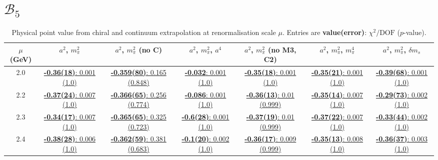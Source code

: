 \documentclass[12pt]{extarticle}
\begin{document}
\section{$\mathcal{B}_5$}
\begin{table}[h!]
\begin{center}
\begin{tabular}{|c|c|c|c|c|c|c|}
\hline
$\mu$ (GeV) & $a^2$, $m_\pi^2$& $a^2$, $m_\pi^2$ (no C)& $a^2$, $m_\pi^2$, $a^4$& $a^2$, $m_\pi^2$ (no M3, C2)& $a^2$, $m_\pi^2$, $m_\pi^4$& $a^2$, $m_\pi^2$, $\delta m_s$\\
\hline
2.0& \hyperlink{TT/NPR/a2m2_20.pdf.1}{\textbf{-0.36(18)}: 0.001 (1.0)} & \hyperlink{TT/NPR/a2m2noC_20.pdf.1}{\textbf{-0.359(80)}: 0.165 (0.848)} & \hyperlink{TT/NPR/a2a4m2_20.pdf.1}{\textbf{-0.032}: 0.001 (1.0)} & \hyperlink{TT/NPR/a2m2mcut_20.pdf.1}{\textbf{-0.35(18)}: 0.001 (1.0)} & \hyperlink{TT/NPR/a2m2m4_20.pdf.1}{\textbf{-0.35(21)}: 0.001 (1.0)} & \hyperlink{TT/NPR/a2m2delm_20.pdf.1}{\textbf{-0.39(68)}: 0.001 (1.0)}\\
2.2& \hyperlink{TT/NPR/a2m2_22.pdf.1}{\textbf{-0.37(24)}: 0.007 (1.0)} & \hyperlink{TT/NPR/a2m2noC_22.pdf.1}{\textbf{-0.366(65)}: 0.256 (0.774)} & \hyperlink{TT/NPR/a2a4m2_22.pdf.1}{\textbf{-0.086}: 0.001 (1.0)} & \hyperlink{TT/NPR/a2m2mcut_22.pdf.1}{\textbf{-0.36(13)}: 0.01 (0.999)} & \hyperlink{TT/NPR/a2m2m4_22.pdf.1}{\textbf{-0.35(14)}: 0.007 (1.0)} & \hyperlink{TT/NPR/a2m2delm_22.pdf.1}{\textbf{-0.29(73)}: 0.002 (1.0)}\\
2.3& \hyperlink{TT/NPR/a2m2_23.pdf.1}{\textbf{-0.34(17)}: 0.007 (1.0)} & \hyperlink{TT/NPR/a2m2noC_23.pdf.1}{\textbf{-0.365(65)}: 0.325 (0.723)} & \hyperlink{TT/NPR/a2a4m2_23.pdf.1}{\textbf{-0.6(28)}: 0.001 (1.0)} & \hyperlink{TT/NPR/a2m2mcut_23.pdf.1}{\textbf{-0.37(19)}: 0.01 (0.999)} & \hyperlink{TT/NPR/a2m2m4_23.pdf.1}{\textbf{-0.37(22)}: 0.007 (1.0)} & \hyperlink{TT/NPR/a2m2delm_23.pdf.1}{\textbf{-0.33(44)}: 0.002 (1.0)}\\
2.4& \hyperlink{TT/NPR/a2m2_24.pdf.1}{\textbf{-0.38(28)}: 0.006 (1.0)} & \hyperlink{TT/NPR/a2m2noC_24.pdf.1}{\textbf{-0.362(59)}: 0.381 (0.683)} & \hyperlink{TT/NPR/a2a4m2_24.pdf.1}{\textbf{-0.1(20)}: 0.002 (1.0)} & \hyperlink{TT/NPR/a2m2mcut_24.pdf.1}{\textbf{-0.36(17)}: 0.009 (0.999)} & \hyperlink{TT/NPR/a2m2m4_24.pdf.1}{\textbf{-0.35(13)}: 0.008 (1.0)} & \hyperlink{TT/NPR/a2m2delm_24.pdf.1}{\textbf{-0.36(37)}: 0.003 (1.0)}\\
\hline
\end{tabular}
\caption{Physical point value from chiral and continuum extrapolation at renormalisation scale $\mu$. Entries are \textbf{value(error)}: $\chi^2/\text{DOF}$ ($p$-value).}
\end{center}
\end{table}
\end{document}
